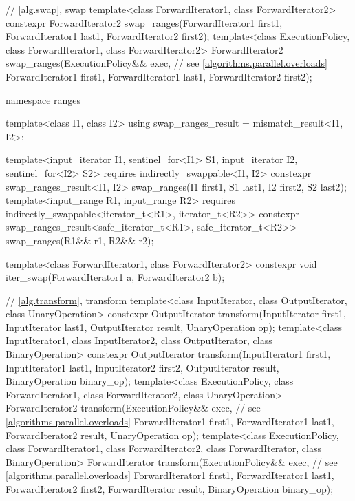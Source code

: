 \begin{codeblock}
{  // \ref{alg.swap}, swap
  template<class ForwardIterator1, class ForwardIterator2>
    constexpr ForwardIterator2 swap_ranges(ForwardIterator1 first1, ForwardIterator1 last1,
                                           ForwardIterator2 first2);
  template<class ExecutionPolicy, class ForwardIterator1, class ForwardIterator2>
    ForwardIterator2 swap_ranges(ExecutionPolicy&& exec,        // see \ref{algorithms.parallel.overloads}
                                 ForwardIterator1 first1, ForwardIterator1 last1,
                                 ForwardIterator2 first2);

  namespace ranges {
    template<class I1, class I2>
    using swap_ranges_result = mismatch_result<I1, I2>;

    template<input_iterator I1, sentinel_for<I1> S1, input_iterator I2, sentinel_for<I2> S2>
      requires indirectly_swappable<I1, I2>
      constexpr swap_ranges_result<I1, I2>
        swap_ranges(I1 first1, S1 last1, I2 first2, S2 last2);
    template<input_range R1, input_range R2>
      requires indirectly_swappable<iterator_t<R1>, iterator_t<R2>>
      constexpr swap_ranges_result<safe_iterator_t<R1>, safe_iterator_t<R2>>
        swap_ranges(R1&& r1, R2&& r2);
  }

  template<class ForwardIterator1, class ForwardIterator2>
    constexpr void iter_swap(ForwardIterator1 a, ForwardIterator2 b);

  // \ref{alg.transform}, transform
  template<class InputIterator, class OutputIterator, class UnaryOperation>
    constexpr OutputIterator
      transform(InputIterator first1, InputIterator last1,
                OutputIterator result, UnaryOperation op);
  template<class InputIterator1, class InputIterator2, class OutputIterator,
           class BinaryOperation>
    constexpr OutputIterator
      transform(InputIterator1 first1, InputIterator1 last1,
                InputIterator2 first2, OutputIterator result,
                BinaryOperation binary_op);
  template<class ExecutionPolicy, class ForwardIterator1, class ForwardIterator2,
           class UnaryOperation>
    ForwardIterator2
      transform(ExecutionPolicy&& exec,                         // see \ref{algorithms.parallel.overloads}
                ForwardIterator1 first1, ForwardIterator1 last1,
                ForwardIterator2 result, UnaryOperation op);
  template<class ExecutionPolicy, class ForwardIterator1, class ForwardIterator2,
           class ForwardIterator, class BinaryOperation>
    ForwardIterator
      transform(ExecutionPolicy&& exec,                         // see \ref{algorithms.parallel.overloads}
                ForwardIterator1 first1, ForwardIterator1 last1,
                ForwardIterator2 first2, ForwardIterator result,
                BinaryOperation binary_op);

}
\end{codeblock}
